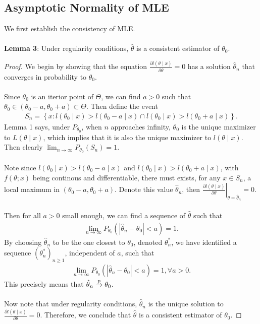 \subsection{Asymptotic Normality of MLE}
We first establish the consistency of MLE.\\\\
\textbf{Lemma 3}: Under regularity conditions, $\hat{\theta}$ is a consistent estimator of $\theta_0$.
\begin{proof}
We begin by showing that the equation $\frac{\partial l(\theta\mid x)}{\partial\theta}=0$ has a solution $\hat{\theta}_n$ that converges in probability to $\theta_0$.\\\\
Since $\theta_0$ is an iterior point of $\Theta$, we can find $a>0$ such that $\theta_0 \in (\theta_0-a, \theta_0+a) \subset \Theta$. Then define the event
\begin{align}
S_n = \left\{ x: l(\theta_0 \mid x) > l(\theta_0 - a \mid x) \cap l(\theta_0 \mid x) > l(\theta_0 + a \mid x) \right\}.
\end{align}
Lemma 1 says, under $P_{\theta_0}$, when $n$ approaches infinity, $\theta_0$ is the unique maximizer to $L(\theta\mid x)$, which implies that it is also the unique maximizer to $l(\theta\mid x)$. Then clearly $\lim_{n\to\infty}P_{\theta_0}(S_n) = 1$.\\\\
Note since $l(\theta_0\mid x) > l(\theta_0-a\mid x)$ and $l(\theta_0\mid x) > l(\theta_0+a\mid x)$, with $f(\theta; x)$ being continous and differentiable, there must exists, for any $x\in S_n$, a local maximum in $(\theta_0-a, \theta_0+a)$. Denote this value $\hat{\theta}_n$, then $\left.\frac{\partial l(\theta\mid x)}{\partial\theta}\right\vert_{\theta=\hat{\theta}_n}=0$.\\\\
Then for all $a>0$ small enough, we can find a sequence of $\hat{\theta}$ such that
\begin{align}
\lim_{n\to\infty}P_{\theta_0}\left( |\hat{\theta}_n - \theta_0| < a \right) = 1.
\end{align}
By choosing $\hat{\theta}_n$ to be the one closest to $\theta_0$, denoted $\theta^*_n$, we have identified a sequence $\left(\theta^*_n\right)_{n\geq1}$, independent of $a$, such that
\begin{align}
\lim_{n\to\infty}P_{\theta_0}\left( |\hat{\theta}_n - \theta_0| < a \right) = 1, \forall a > 0.
\end{align}
This precisely means that $\hat{\theta}_n \overset{p}{\rightarrow} \theta_0$.\\\\
Now note that under regularity conditions, $\hat{\theta}_n$ is the unique solution to $\frac{\partial l(\theta\mid x)}{\partial\theta}=0$. Therefore, we conclude that $\hat{\theta}$ is a consistent estimator of $\theta_0$.
\end{proof}
